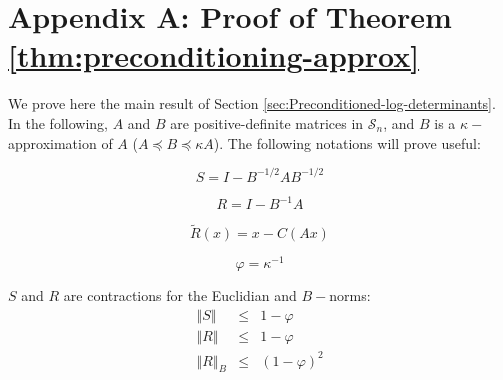 
\section*{Appendix A: Proof of Theorem \ref{thm:preconditioning-approx}}

We prove here the main result of Section \ref{sec:Preconditioned-log-determinants}.
In the following, $A$ and $B$ are positive-definite matrices in
$\mathcal{S}_{n}$, and $B$ is a $\kappa-$approximation of $A$
($A\preceq B\preceq\kappa A$). The following notations will prove
useful:

\begin{equation}
S=I-B^{-1/2}AB^{-1/2}\label{eq:S-def}
\end{equation}


\begin{equation}
R=I-B^{-1}A\label{eq:R-def}
\end{equation}


\[
\tilde{R}\left(x\right)=x-C\left(Ax\right)
\]


\[
\varphi=\kappa^{-1}
\]


\begin{lemma}\label{lem:S-R-contractions} $S$ and $R$ are contractions
for the Euclidian and $B-$norms: 
\begin{eqnarray*}
\left\Vert S\right\Vert  & \leq & 1-\varphi\\
\left\Vert R\right\Vert  & \leq & 1-\varphi\\
\left\Vert R\right\Vert _{B} & \leq & \left(1-\varphi\right)^{2}
\end{eqnarray*}
\end{lemma} 

